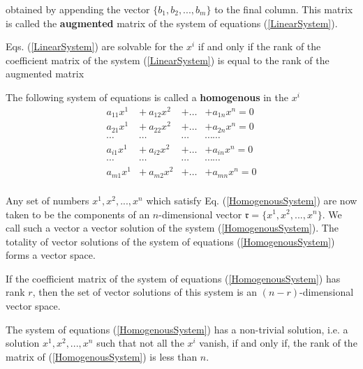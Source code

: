 obtained by appending the vector $\{b_1, b_2, ..., b_m\}$ to the final column. This matrix is called the {\bf augmented} matrix of the system of equations (\ref{LinearSystem}).

\begin{theorem}
Eqs. (\ref{LinearSystem}) are solvable for the $x^i$ if and only if the rank of the coefficient matrix of the system (\ref{LinearSystem}) is equal to the rank of the augmented matrix
\end{theorem}

The following system of equations is called a {\bf homogenous} {\elevenit in the $x^i$}
\begin{equation}
\begin{array}{cccc}
a_{11}x^1  &+ ~a_{12}x^2   & + \hdots  &+  a_{1n}x^n   = 0 \\
a_{21}x^1  &+ ~ a_{22}x^2   &+ \hdots  &+  a_{2n}x^n   = 0 \\
 \cdots       &\cdots            &\cdots      &\cdots                \cdots \\
a_{i1}x^1   &+  ~a_{i2}x^2    & + \hdots  &+  a_{in}x^n    = 0 \\
 \cdots       &\cdots            &\cdots      &\cdots                 \cdots\\
a_{m1}x^1 &+  ~a_{m2}x^2 & + \hdots  & +  a_{mn}x^n = 0 \\
\end{array}
\label{HomogenousSystem}
\end{equation}

Any set of numbers $x^1, x^2, ..., x^n$ which satisfy Eq. (\ref{HomogenousSystem}) are now taken to be the components of an $n$-dimensional vector $\mathfrak{r} = \{x^1, x^2, ..., x^n\}$. 
We call such a vector a {\elevenit vector solution} of the system (\ref{HomogenousSystem}). The totality of vector solutions of the system of equations (\ref{HomogenousSystem}) forms a
vector space.

\begin{theorem}
If the coefficient matrix of the system of equations (\ref{HomogenousSystem}) has rank $r$, then the set of vector solutions of this system is an $(n-r)$-dimensional vector space. 
\end{theorem}

\begin{theorem}
The system of equations (\ref{HomogenousSystem}) has a non-trivial solution, i.e. a solution $x^1, x^2, ..., x^n$ such that not all the $x^i$ vanish, if and only if, the rank of the matrix of 
(\ref{HomogenousSystem}) is less than $n$.
\end{theorem}

